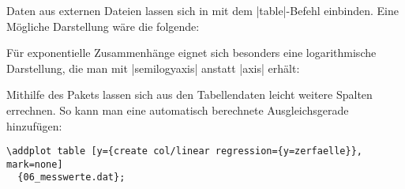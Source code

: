 % 

Daten aus externen Dateien lassen sich in  mit dem |table|-Befehl einbinden. Eine Mögliche Darstellung wäre die folgende:

\begin{LTXexample}[pos=b,rframe={},preset=\centering]
\end{LTXexample}

Für exponentielle Zusammenhänge eignet sich besonders eine logarithmische Darstellung, die man mit |semilogyaxis| anstatt |axis| erhält:

\begin{center}
\end{center}

Mithilfe des Pakets  lassen sich aus den Tabellendaten leicht weitere Spalten errechnen. So kann man eine automatisch berechnete Ausgleichsgerade hinzufügen:

\begin{lstlisting}
\addplot table [y={create col/linear regression={y=zerfaelle}}, mark=none]
  {06_messwerte.dat};
\end{lstlisting}
